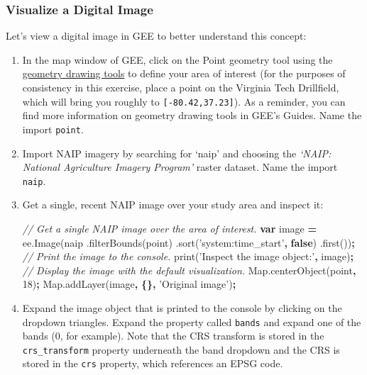 \documentclass[
]{article}
\newenvironment{Shaded}{\begin{snugshade}}{\end{snugshade}}
\newcommand{\AttributeTok}[1]{\textcolor[rgb]{0.77,0.63,0.00}{#1}}
\newcommand{\CommentTok}[1]{\textcolor[rgb]{0.56,0.35,0.01}{\textit{#1}}}
\newcommand{\DecValTok}[1]{\textcolor[rgb]{0.00,0.00,0.81}{#1}}
\newcommand{\KeywordTok}[1]{\textcolor[rgb]{0.13,0.29,0.53}{\textbf{#1}}}
\newcommand{\NormalTok}[1]{#1}
\newcommand{\OperatorTok}[1]{\textcolor[rgb]{0.81,0.36,0.00}{\textbf{#1}}}
\newcommand{\StringTok}[1]{\textcolor[rgb]{0.31,0.60,0.02}{#1}}
\newcommand{\VariableTok}[1]{\textcolor[rgb]{0.00,0.00,0.00}{#1}}
\begin{document}
\hypertarget{visualize-a-digital-image}{%
\subsubsection{Visualize a Digital Image}\label{visualize-a-digital-image}}

Let's view a digital image in GEE to better understand this concept:

\begin{enumerate}
\def\labelenumi{\arabic{enumi}.}
\item
  In the map window of GEE, click on the Point geometry tool using the \href{https://developers.google.com/earth-engine/playground\#geometry-tools}{geometry drawing tools} to define your area of interest (for the purposes of consistency in this exercise, place a point on the Virginia Tech Drillfield, which will bring you roughly to
  \texttt{{[}-80.42,37.23{]}}). As a reminder, you can find more information on geometry drawing tools in GEE's Guides. Name the import \texttt{point}.
\item
  Import NAIP imagery by searching for `naip' and choosing the \emph{`NAIP: National Agriculture Imagery Program'} raster dataset. Name the import \texttt{naip}.
\item
  Get a single, recent NAIP image over your study area and inspect it:

\begin{Shaded}
\begin{Highlighting}[]
\CommentTok{//  Get a single NAIP image over the area of interest.  }
\KeywordTok{var}\NormalTok{  image }\OperatorTok{=} \VariableTok{ee}\NormalTok{.}\AttributeTok{Image}\NormalTok{(naip  }
\NormalTok{                      .}\AttributeTok{filterBounds}\NormalTok{(point)}
\NormalTok{                      .}\AttributeTok{sort}\NormalTok{(}\StringTok{'system:time_start'}\OperatorTok{,} \KeywordTok{false}\NormalTok{)}
\NormalTok{                      .}\AttributeTok{first}\NormalTok{())}\OperatorTok{;}      
\CommentTok{//  Print the image to the console.  }
\AttributeTok{print}\NormalTok{(}\StringTok{'Inspect the image object:'}\OperatorTok{,}\NormalTok{ image)}\OperatorTok{;}     
\CommentTok{//  Display the image with the default visualization.  }
\VariableTok{Map}\NormalTok{.}\AttributeTok{centerObject}\NormalTok{(point}\OperatorTok{,} \DecValTok{18}\NormalTok{)}\OperatorTok{;}  
\VariableTok{Map}\NormalTok{.}\AttributeTok{addLayer}\NormalTok{(image}\OperatorTok{,} \OperatorTok{\{\},} \StringTok{'Original image'}\NormalTok{)}\OperatorTok{;}
\end{Highlighting}
\end{Shaded}
\item
  Expand the image object that is printed to the console by clicking on the dropdown triangles. Expand the property called \texttt{bands} and expand one of the bands (0, for example). Note that the CRS transform is stored in the \texttt{crs\_transform} property underneath the band dropdown and the CRS is stored in the \texttt{crs} property, which references an EPSG code.


\end{enumerate}
\end{document}
